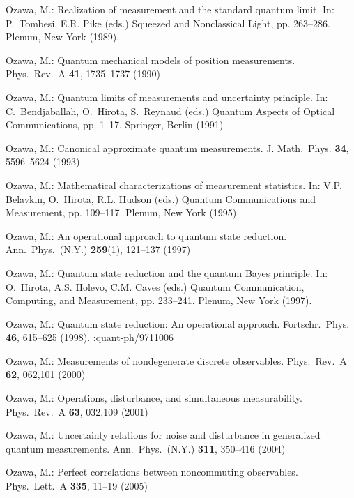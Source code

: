 \documentclass[12pt]{article}
\begin{document}
\begin{thebibliography}{10}
Ozawa, M.: Realization of measurement and the standard quantum limit.
\newblock In: P.~Tombesi, E.R. Pike (eds.) Squeezed and Nonclassical Light, pp.
  263--286. Plenum, New York (1989).

Ozawa, M.: Quantum mechanical models of position measurements.
\newblock Phys.\ Rev.\ A \textbf{{41}}, 1735--1737 (1990)

Ozawa, M.: Quantum limits of measurements and uncertainty principle.
\newblock In: C.~Bendjaballah, O.~Hirota, S.~Reynaud (eds.) Quantum Aspects of
  Optical Communications, pp. 1--17. Springer, Berlin (1991)

Ozawa, M.: Canonical approximate quantum measurements.
\newblock J. Math.\ Phys. \textbf{{34}}, 5596--5624 (1993)

Ozawa, M.: Mathematical characterizations of measurement statistics.
\newblock In: V.P. Belavkin, O.~Hirota, R.L. Hudson (eds.) Quantum
  Communications and Measurement, pp. 109--117. Plenum, New York (1995)

Ozawa, M.: An operational approach to quantum state reduction.
\newblock Ann.\ Phys.\ (N.Y.) \textbf{{259}}(1), 121--137 (1997)

Ozawa, M.: Quantum state reduction and the quantum {Bayes} principle.
\newblock In: O.~Hirota, A.S. Holevo, C.M. Caves (eds.) Quantum Communication,
  Computing, and Measurement, pp. 233--241. Plenum, New York (1997).

Ozawa, M.: Quantum state reduction: {An} operational approach.
\newblock Fortschr.\ Phys. \textbf{{46}}, 615--625 (1998).
:quant-ph/9711006

Ozawa, M.: Measurements of nondegenerate discrete observables.
\newblock Phys.\ Rev.\ A \textbf{{62}}, 062,101 (2000)

Ozawa, M.: Operations, disturbance, and simultaneous measurability.
\newblock Phys.\ Rev.\ A \textbf{{63}}, 032,109 (2001)

Ozawa, M.: Uncertainty relations for noise and disturbance in generalized
  quantum measurements.
\newblock Ann.\ Phys.\ (N.Y.) \textbf{311}, 350--416 (2004)

Ozawa, M.: Perfect correlations between noncommuting observables.
\newblock Phys.\ Lett.\ A \textbf{335}, 11--19 (2005)


\end{thebibliography}
\end{document}
